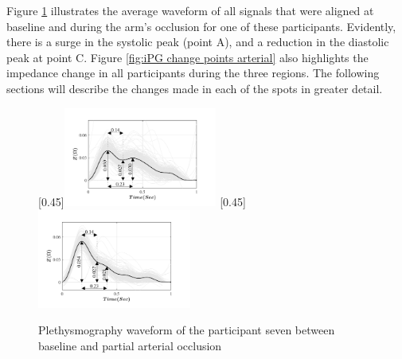 Figure \ref{fig:iPG arterial} illustrates the average waveform of all signals that were aligned at baseline and during the arm's occlusion for one of these participants. Evidently, there is a surge in the systolic peak (point A), and  a reduction in the diastolic peak at point C. Figure \ref{fig:iPG change points arterial} also highlights the impedance change in all participants during the three regions. The following sections will describe the changes made in each of the spots in greater detail.

\begin{figure}
	\centering
	\null\hfill%
	[0.45\textwidth]{\includegraphics[width=0.45\textwidth, trim={0.5cm 0cm 1.5cm 0 cm}, clip]{figure_apa_4a}}%
	\hfill%
	[0.45\textwidth]{\includegraphics[width=0.45\textwidth, trim={0.5cm 0cm 1.5cm 0 cm}, clip]{figure_apa_4b}}%
	\hfill\null%
	\caption{Plethysmography waveform of the participant seven between baseline and partial arterial occlusion}
	\label{fig:iPG arterial}
	
	\vspace{1cm}
	

\end{figure}
